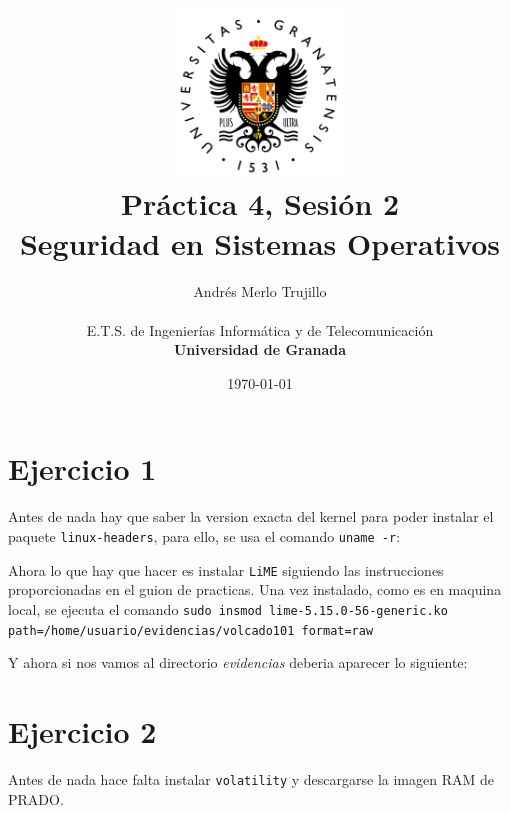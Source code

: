 \documentclass{article}
\title{
\includegraphics[width=1.75in]{imagenes/UGR-Logo.png} \\
\vspace*{1in}
\textbf{Práctica 4, Sesión 2} \\
Seguridad en Sistemas Operativos \\
\vspace*{0.5in}}
\author{Andrés Merlo Trujillo \\
\vspace*{0.5in} \\
E.T.S. de Ingenierías Informática y de Telecomunicación \\
\textbf{Universidad de Granada}} \date{\today}
\begin{document}
\begin{titlingpage}
\maketitle
\end{titlingpage}

\newpage

\tableofcontents

\newpage

\pagestyle{fancy}

\section{Ejercicio 1}

Antes de nada hay que saber la version exacta del kernel para poder instalar el paquete \verb|linux-headers|, para ello, se usa el comando \verb|uname -r|:


Ahora lo que hay que hacer es instalar \verb|LiME| siguiendo las instrucciones proporcionadas en el guion de practicas. Una vez instalado, como es en maquina local, se ejecuta el comando \verb|sudo insmod lime-5.15.0-56-generic.ko path=/home/usuario/evidencias/volcado101 format=raw|


Y ahora si nos vamos al directorio \textit{evidencias} deberia aparecer lo siguiente:


\section{Ejercicio 2}

Antes de nada hace falta instalar \verb|volatility| y descargarse la imagen RAM de PRADO. %
\end{document}
